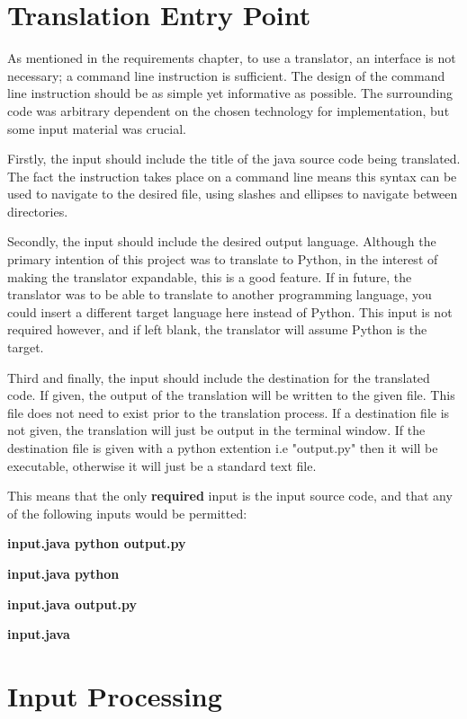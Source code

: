 \documentclass{l4proj}
\begin{document}
\section{Translation Entry Point}
As mentioned in the requirements chapter, to use a translator, an interface is not necessary; a command line instruction is sufficient. The design of the command line instruction should be as simple yet informative as possible. The surrounding code was arbitrary dependent on the chosen technology for implementation, but some input material was crucial. 

Firstly, the input should include the title of the java source code being translated. The fact the instruction takes place on a command line means this syntax can be used to navigate to the desired file, using slashes and ellipses to navigate between directories. 

Secondly, the input should include the desired output language. Although the primary intention of this project was to translate to Python, in the interest of making the translator expandable, this is a good feature. If in future, the translator was to be able to translate to another programming language, you could insert a different target language here instead of Python. This input is not required however, and if left blank, the translator will assume Python is the target.

Third and finally, the input should include the destination for the translated code. If given, the output of the translation will be written to the given file. This file does not need to exist prior to the translation process. If a destination file is not given, the translation will just be output in the terminal window. If the destination file is given with a python extention i.e "output.py" then it will be executable, otherwise it will just be a standard text file.

This means that the only \textbf{required} input is the input source code, and that any of the following inputs would be permitted:

\textbf{input.java python output.py}

\textbf{input.java python}

\textbf{input.java output.py}

\textbf{input.java}

\section{Input Processing}
\end{document}
